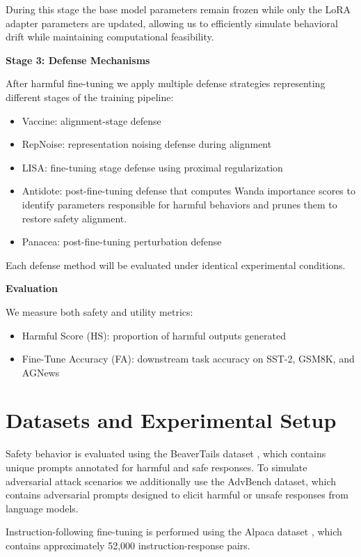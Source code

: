 \documentclass[11pt]{article}
\begin{document}
During this stage the base model parameters remain frozen while only the LoRA adapter parameters are updated, allowing us to efficiently simulate behavioral drift while maintaining computational feasibility.

\textbf{Stage 3: Defense Mechanisms}

After harmful fine-tuning we apply multiple defense strategies representing different stages of the training pipeline:

\begin{itemize}
\item Vaccine: alignment-stage defense
\item RepNoise: representation noising defense during alignment
\item LISA: fine-tuning stage defense using proximal regularization
\item Antidote: post-fine-tuning defense that computes Wanda importance scores to identify parameters responsible for harmful behaviors and prunes them to restore safety alignment.
\item Panacea: post-fine-tuning perturbation defense
\end{itemize}

Each defense method will be evaluated under identical experimental conditions.

\textbf{Evaluation}

We measure both safety and utility metrics:

\begin{itemize}
\item Harmful Score (HS): proportion of harmful outputs generated
\item Fine-Tune Accuracy (FA): downstream task accuracy on SST-2, GSM8K, and AGNews
\end{itemize}

\section{Datasets and Experimental Setup}

Safety behavior is evaluated using the BeaverTails dataset \citep{ji2023beavertails}, which contains unique prompts annotated for harmful and safe responses. 
To simulate adversarial attack scenarios we additionally use the AdvBench dataset, which contains adversarial prompts designed to elicit harmful or unsafe responses from language models.

Instruction-following fine-tuning is performed using the Alpaca dataset \citep{taori2023alpaca}, which contains approximately 52,000 instruction-response pairs.
\end{document}
